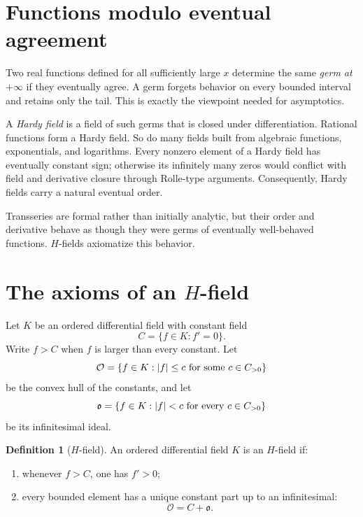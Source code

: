 \documentclass[11pt,oneside]{book}
\theoremstyle{definition}
\newtheorem{definition}[theorem]{Definition}
\theoremstyle{remark}
\DeclarePairedDelimiter{\abs}{\lvert}{\rvert}
\begin{document}
\section{Functions modulo eventual agreement}

Two real functions defined for all sufficiently large $x$ determine the same
\emph{germ at $+\infty$} if they eventually agree. A germ forgets behavior on
every bounded interval and retains only the tail. This is exactly the viewpoint
needed for asymptotics.

A \emph{Hardy field} is a field of such germs that is closed under
differentiation. Rational functions form a Hardy field. So do many fields built
from algebraic functions, exponentials, and logarithms. Every nonzero element of
a Hardy field has eventually constant sign; otherwise its infinitely many zeros
would conflict with field and derivative closure through Rolle-type arguments.
Consequently, Hardy fields carry a natural eventual order.

Transseries are formal rather than initially analytic, but their order and
derivative behave as though they were germs of eventually well-behaved
functions. $H$-fields axiomatize this behavior.

\section{The axioms of an \texorpdfstring{$H$}{H}-field}

Let $K$ be an ordered differential field with constant field
\[
  C=\{f\in K:f'=0\}.
\]
Write $f>C$ when $f$ is larger than every constant. Let
\[
  \mathcal O=\{f\in K:\abs f\le c\text{ for some }c\in C_{>0}\}
\]
be the convex hull of the constants, and let
\[
  \mathfrak o=\{f\in K:\abs f<c\text{ for every }c\in C_{>0}\}
\]
be its infinitesimal ideal.

\begin{definition}[$H$-field]
An ordered differential field $K$ is an $H$-field if:
\begin{enumerate}
\item whenever $f>C$, one has $f'>0$;
\item every bounded element has a unique constant part up to an infinitesimal:
\begin{equation}
  \mathcal O=C+\mathfrak o.
  \label{eq:h-field-bounded-decomposition}
\end{equation}
\end{enumerate}
\end{definition}
\end{document}
